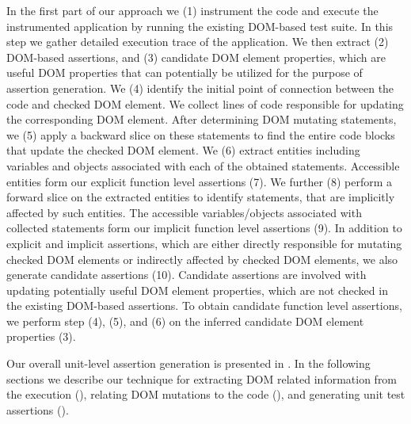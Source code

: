 In the first part of our approach we (1) instrument the \javascript code and execute the instrumented application by running the existing DOM-based test suite. In this step we gather detailed execution trace of the application. We then extract (2) DOM-based assertions, and (3) candidate DOM element properties, which are useful DOM properties that can potentially be utilized for the purpose of assertion generation. We (4) identify the initial point of connection between the \javascript code and checked DOM element. We collect lines of code responsible for updating the corresponding DOM element. After determining DOM mutating statements, we (5) apply a backward slice on these statements to find the entire code blocks that update the checked DOM element. We (6) extract \javascript entities including variables and objects associated with each of the obtained statements. Accessible entities form our explicit function level assertions (7). We further (8) perform a forward slice on the extracted \javascript entities to identify statements, that are implicitly affected by such entities. The accessible \javascript variables/objects associated with collected statements form our implicit function level assertions (9). In addition to explicit and implicit assertions, which are either directly responsible for mutating checked DOM elements or indirectly affected by checked DOM elements, we also generate candidate assertions (10). Candidate assertions are involved with updating potentially useful DOM element properties, which are not checked in the existing DOM-based assertions. To obtain candidate function level assertions, we perform step (4), (5), and (6) on the inferred candidate DOM element properties (3).

Our overall unit-level assertion generation is presented in . In the following sections we describe our technique for extracting DOM related information from the execution (), relating
DOM mutations to the \javascript code (), and generating unit test assertions ().   


         
